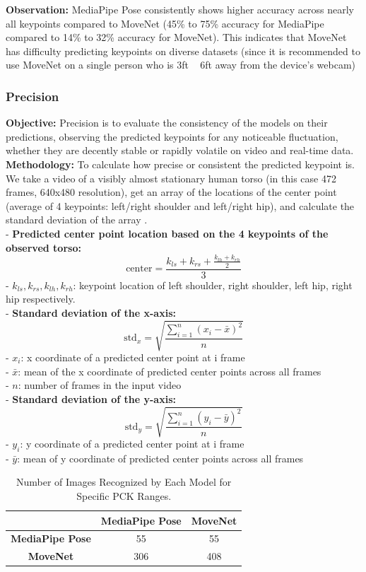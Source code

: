 \documentclass[12pt]{article}
\begin{document}
\textbf{Observation:} MediaPipe Pose consistently shows higher accuracy across nearly all keypoints compared to MoveNet (45\% to 75\% accuracy for MediaPipe compared to 14\% to 32\% accuracy for MoveNet). This indicates that MoveNet has difficulty predicting keypoints on diverse datasets (since it is recommended to use MoveNet on a single person who is 3ft ~ 6ft away from the device’s webcam)

\subsubsection{Precision}

\hspace*{1.5em}\textbf{Objective:} Precision is to evaluate the consistency of the models on their predictions, observing the predicted keypoints for any noticeable fluctuation, whether they are decently stable or rapidly volatile on video and real-time data.\\

\textbf{Methodology:} To calculate how precise or consistent the predicted keypoint is. We take a video of a visibly almost stationary human torso (in this case 472 frames, 640x480 resolution), get an array of the locations of the center point (average of 4 keypoints: left/right shoulder and left/right hip), and calculate the standard deviation of the array \cite{chung2022}.\\

- \textbf{Predicted center point location based on the 4 keypoints of the observed torso:}
\[
    \text{center} = \frac{k_{ls} + k_{rs} + \frac{k_{lh} + k_{rh}}{2}}{3}
\]
- \(k_{ls}, k_{rs}, k_{lh}, k_{rh}\): keypoint location of left shoulder, right shoulder, left hip, right hip respectively.\\

- \textbf{Standard deviation of the x-axis:}
\[
    \text{std}_x = \sqrt{\frac{\sum_{i=1}^{n} (x_i - \bar{x})^2}{n}}
\]
- \(x_i\): x coordinate of a predicted center point at i frame\\
- \(\bar{x}\): mean of the x coordinate of predicted center points across all frames\\
- \(n\): number of frames in the input video\\

- \textbf{Standard deviation of the y-axis:}
\[
    \text{std}_y = \sqrt{\frac{\sum_{i=1}^{n} (y_i - \bar{y})^2}{n}}
\]
- \(y_i\): y coordinate of a predicted center point at i frame\\
- \(\bar{y}\): mean of y coordinate of predicted center points across all frames
\begin{table}[h]
    \centering
    \caption{Number of Images Recognized by Each Model for Specific PCK Ranges.}
    \begin{tabular}{|c|c|c|}
        \hline
        & \textbf{MediaPipe Pose} & \textbf{MoveNet}\\
        \hline
        \textbf{MediaPipe Pose} & 55 & 55  \\
        \hline
        \textbf{MoveNet} & 306 & 408  \\
        \hline
    \end{tabular}
\end{table}
\end{document}

